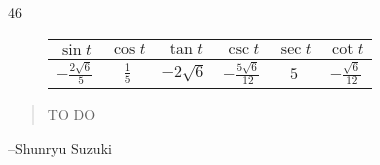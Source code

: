 \documentclass{exam}
\begin{document}
\begin{description}
      \item[46]
        \begin{tabular}[H]{cccccc}
          \toprule
          $\sin t$                & $\cos t$      & $\tan t$      & $\csc t$                 & $\sec t$ & $\cot t$ \\
          \midrule
          $-\frac{2 \sqrt{6}}{5}$ & $\frac{1}{5}$ & $-2 \sqrt{6}$ & $-\frac{5 \sqrt{6}}{12}$ & $5$      & $-\frac{\sqrt{6}}{12}$ \\
          \bottomrule
        \end{tabular}

    \end{description}

  \else
    \vspace{1 cm}
    \begin{quote}
      \begin{em}
        TO DO
      \end{em}
    \end{quote}
    \hspace{1 cm} --Shunryu Suzuki
  \fi
\end{document}
